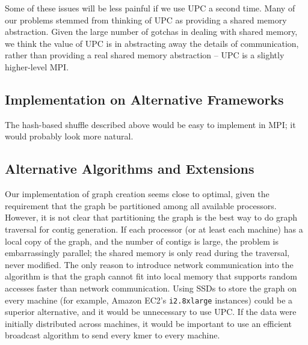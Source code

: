 \documentclass{article}
\begin{document}
Some of these issues will be less painful if we use UPC a second time.  Many of our problems stemmed from thinking of UPC as providing a shared memory abstraction.  Given the large number of gotchas in dealing with shared memory, we think the value of UPC is in abstracting away the details of communication, rather than providing a real shared memory abstraction -- UPC is a slightly higher-level MPI.

\subsection{Implementation on Alternative Frameworks}
The hash-based shuffle described above would be easy to implement in MPI; it would probably look more natural. %

\subsection{Alternative Algorithms and Extensions}
Our implementation of graph creation seems close to optimal, given the requirement that the graph be partitioned among all available processors.  However, it is not clear that partitioning the graph is the best way to do graph traversal for contig generation.  If each processor (or at least each machine) has a local copy of the graph, and the number of contigs is large, the problem is embarrassingly parallel; the shared memory is only read during the traversal, never modified.  The only reason to introduce network communication into the algorithm is that the graph cannot fit into local memory that supports random accesses faster than network communication.  Using SSDs to store the graph on every machine (for example, Amazon EC2's \texttt{i2.8xlarge} instances) could be a superior alternative, and it would be unnecessary to use UPC.  If the data were initially distributed across machines, it would be important to use an efficient broadcast algorithm to send every kmer to every machine.


%
%
\end{document}
